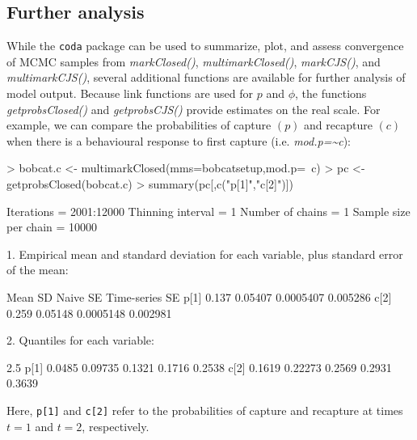 \documentclass[12pt]{article}
\begin{document}
\subsection{Further analysis}
While the \verb|coda| package can be used to summarize, plot, and assess convergence of MCMC samples from \textit{markClosed()}, \textit{multimarkClosed()}, \textit{markCJS()}, and \textit{multimarkCJS()}, several additional functions are available for further analysis of model output. Because link functions are used for $p$ and $\phi$, the functions \textit{getprobsClosed()} and \textit{getprobsCJS()} provide estimates on the real scale. For example, we can compare the probabilities of capture $(p)$ and recapture $(c)$ when there is a behavioural response to first capture (i.e. \textit{mod.p={\~{}}c}):
\begin{Schunk}
\begin{Sinput}
> bobcat.c <- multimarkClosed(mms=bobcatsetup,mod.p=~c)
> pc <- getprobsClosed(bobcat.c)
> summary(pc[,c("p[1]","c[2]")])
\end{Sinput}
\end{Schunk}
\begin{Schunk}
\begin{Soutput}
Iterations = 2001:12000
Thinning interval = 1 
Number of chains = 1 
Sample size per chain = 10000 

1. Empirical mean and standard deviation for each variable,
   plus standard error of the mean:

      Mean      SD  Naive SE Time-series SE
p[1] 0.137 0.05407 0.0005407       0.005286
c[2] 0.259 0.05148 0.0005148       0.002981

2. Quantiles for each variable:

       2.5%
p[1] 0.0485 0.09735 0.1321 0.1716 0.2538
c[2] 0.1619 0.22273 0.2569 0.2931 0.3639
\end{Soutput}
\end{Schunk}
Here, \verb|p[1]| and \verb|c[2]| refer to the probabilities of capture and recapture at times $t=1$ and $t=2$, respectively.
\end{document}
